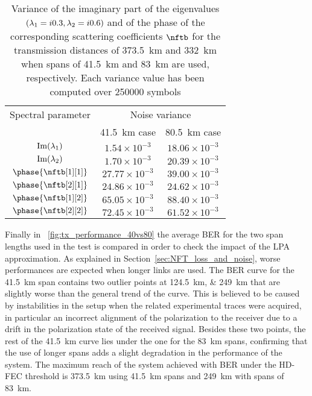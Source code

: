 \begin{table}[t]
    \centering
    \begin{tabular}{ccc}
    \hline
    Spectral parameter & \multicolumn{2}{c}{Noise variance} \\
     & \SI{41.5}{\km} case & \SI{80.5}{km} case \\
    \hline
         $\text{Im}(\eig[1])$& $1.54 \times 10^{-3}$ & $18.06 \times 10^{-3}$ \\
         $\text{Im}(\eig[2])$& $1.70 \times 10^{-3}$& $20.39 \times 10^{-3}$ \\
         $\phase{\nftb[1][1]}$&$27.77 \times 10^{-3}$ & $39.00 \times 10^{-3}$ \\
         $\phase{\nftb[2][1]}$&$24.86 \times 10^{-3}$ & $24.62 \times 10^{-3}$ \\
         $\phase{\nftb[1][2]}$&$65.05 \times 10^{-3}$ & $88.40 \times 10^{-3}$ \\
         $\phase{\nftb[2][2]}$&$72.45 \times 10^{-3}$ & $61.52 \times 10^{-3}$ \\
         \hline
    \end{tabular}
    \caption{Variance of the imaginary part of the eigenvalues $(\eig[1] = \iunit0.3, \eig[2] = \iunit0.6)$ and of the phase of the corresponding scattering coefficients $\nftb$ for the transmission distances  of \SI{373.5}{\km} and \SI{332}{\km}  when spans of \SI{41.5}{\km} and \SI{83}{\km} are used, respectively. Each variance value has been computed over \num{250000} symbols}
    \label{tab:noise_variance}
\end{table}

Finally in \figurename~\ref{fig:tx_performance_40vs80}  the average \ac{BER} for the two span lengths
used in the test is compared in order to check the impact of the \ac{LPA} approximation.
As explained in Section~\ref{sec:NFT_loss_and_noise}, worse performances are expected when longer links are used.
The \ac{BER} curve for the \SI{41.5}{\km} span contains two outlier points at  \SIlist{124.5;249}{km}
that are slightly worse than the general trend of the curve.
This is believed to be caused by instabilities in the setup when the related experimental traces were acquired, in particular an incorrect alignment of the polarization to the receiver due to a drift in the polarization state of the received signal. Besides these two points, the rest of the \SI{41.5}{\km} curve lies
under the one for the \SI{83}{\km} spans, confirming that the use of longer
spans adds a slight degradation in the performance of the system. The
maximum reach of the system achieved with \ac{BER} under the \ac{HD-FEC} threshold
is \SI{373.5}{\km} using \SI{41.5}{\km} spans and \SI{249}{\km} with spans of \SI{83}{\km}.

